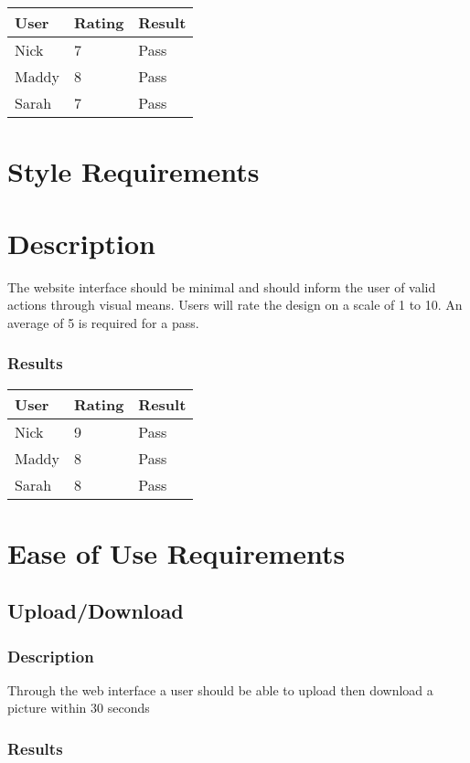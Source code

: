 \documentclass{scrreprt}
\begin{document}
 \centering
 \begin{tabular}{||p{2.5cm}|p{2.5cm}|p{2.5cm}||}
 \hline
 \bf User & \bf Rating & \bf Result\\
 \hline\hline
 Nick & 7 & Pass \\
 \hline
 Maddy & 8 & Pass\\ %
 \hline
 Sarah & 7 & Pass \\
 \hline
 \end{tabular}

\section{Style Requirements}

\section{Description}
\begin{flushleft}
The website interface should be minimal and should inform the user of valid actions through visual means. Users will rate the design on a scale of 1 to 10. An average of 5 is required for a pass.
\subsubsection{Results}
\end{flushleft}
 
 \centering
 \begin{tabular}{||p{2.5cm}|p{2.5cm}|p{2.5cm}||}
 \hline
 \bf User & \bf Rating & \bf Result\\
 \hline\hline
 Nick & 9 & Pass \\
 \hline
 Maddy & 8 & Pass\\ %
 \hline
 Sarah & 8 & Pass \\
 \hline
 \end{tabular}

\section{Ease of Use Requirements}

\subsection{Upload/Download}
\subsubsection{Description}
\begin{flushleft}
Through the web interface a user should be able to upload then download a picture within 30 seconds
\subsubsection{Results}
\end{flushleft}
\end{document}
